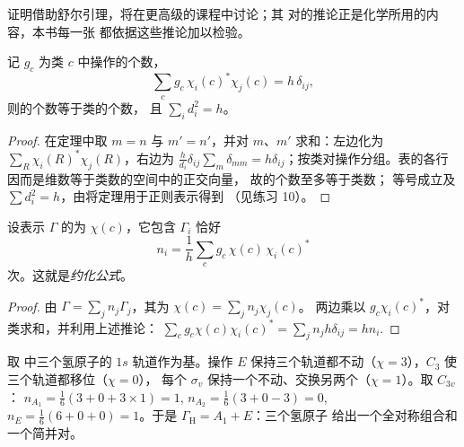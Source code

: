 证明借助舒尔引理，将在更高级的课程中讨论；其
对的推论正是化学所用的内容，本书每一张
都依据这些推论加以检验。

\begin{corollary}[特征标的正交性]\label{cor:b3:group-theory-applied:characters}
记 $g_c$ 为类 $c$ 中操作的个数，
\[
\sum_cg_c\,\chi_i(c)^*\chi_j(c) = h\,\delta_{ij},
\]
则的个数等于类的个数，
且 $\sum_id_i^2 = h$。
\end{corollary}

\begin{proof}
在定理中取 $m = n$ 与 $m' = n'$，并对 $m$、$m'$ 求和：左边化为
$\sum_R\chi_i(R)^*\chi_j(R)$，右边为 $\frac{h}{d_i}\delta_{ij}
\sum_{m}\delta_{mm} = h\delta_{ij}$；按类对操作分组。表的各行
因而是维数等于类数的空间中的正交向量，
故的个数至多等于类数；
等号成立及 $\sum d_i^2 = h$，由将定理用于正则表示得到
（见练习 10）。
\end{proof}

\begin{theorem}[约化公式]\label{thm:b3:group-theory-applied:reduction}
设表示 $\Gamma$ 的为 $\chi(c)$，它包含
$\Gamma_i$ 恰好
\[
n_i = \frac1h\sum_cg_c\,\chi(c)\,\chi_i(c)^*
\]
次。这就是\emph{约化公式}。
\end{theorem}

\begin{proof}
由 $\Gamma = \sum_jn_j\Gamma_j$，其为 $\chi(c) = \sum_jn_j\chi_j(c)$。
两边乘以 $g_c\chi_i(c)^*$，对类求和，并利用上述推论：
$\sum_cg_c\chi(c)\chi_i(c)^* = \sum_jn_jh\delta_{ij} = hn_i$.
\end{proof}

\begin{example}[氨的氢原子轨道]\label{ex:b3:group-theory-applied:nh3}
取  中三个氢原子的 $1s$ 轨道作为基。操作 $E$
保持三个轨道都不动（$\chi = 3$），$C_3$ 使三个轨道都移位（$\chi = 0$），
每个 $\sigma_v$ 保持一个不动、交换另两个（$\chi = 1$）。取 $C_{3v}$ ：
$n_{A_1} = \frac16(3 + 0 + 3\times1) = 1$, $n_{A_2} = \frac16(3 + 0 - 3) = 0$,
$n_E = \frac16(6 + 0 + 0) = 1$。于是 $\Gamma_{\mathrm H} = A_1 + E$：三个氢原子
给出一个全对称组合和一个简并对。
\end{example}

